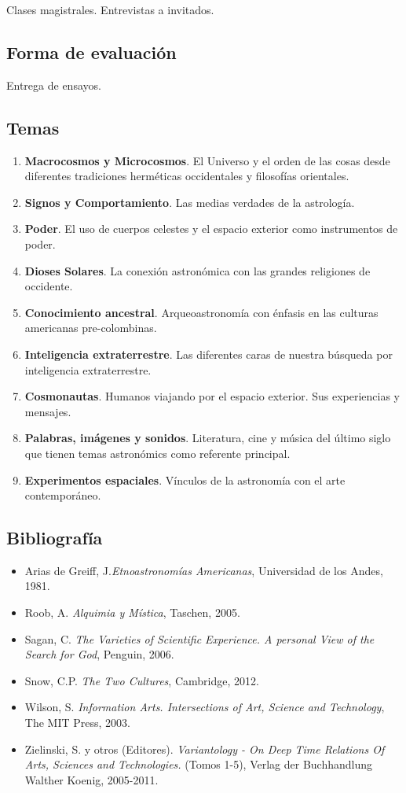 \documentclass{report}
\begin{document}
Clases magistrales. Entrevistas a invitados.

\subsection*{Forma de evaluaci\'on}

Entrega de ensayos.

\subsection*{Temas}

\begin{enumerate}
\item {\bf Macrocosmos y Microcosmos}. El Universo y el orden de las
  cosas desde diferentes tradiciones herm\'eticas occidentales y
  filosof\'ias orientales.
\item {\bf Signos y Comportamiento}. Las medias verdades de la astrolog\'ia.
\item {\bf Poder}. El uso de cuerpos celestes y el espacio exterior como instrumentos de poder. 
\item {\bf Dioses Solares}. La conexi\'on astron\'omica con las grandes religiones de occidente. 
\item {\bf Conocimiento ancestral}. Arqueoastronom\'ia con \'enfasis en las culturas americanas pre-colombinas.
\item {\bf Inteligencia extraterrestre}. Las diferentes caras de
  nuestra b\'usqueda por inteligencia extraterrestre.
\item {\bf Cosmonautas}. Humanos viajando por el espacio exterior. Sus experiencias y mensajes.
\item {\bf Palabras, im\'agenes y sonidos}. Literatura, cine y
  m\'usica del \'ultimo siglo que tienen temas astron\'omics como
  referente principal.
\item {\bf Experimentos espaciales}. V\'inculos de la astronom\'ia con
  el arte contempor\'aneo.
\end{enumerate}

\subsection*{Bibliografía}

\begin{itemize}
\item Arias de Greiff, J.\emph{Etnoastronom\'ias Americanas}, Universidad de los Andes, 1981.
\item Roob, A. \emph{Alquimia y M\'istica}, Taschen, 2005.
\item Sagan, C. \emph{The Varieties of Scientific Experience. A personal View of the Search for God}, Penguin, 2006.
\item Snow, C.P. \emph{The Two Cultures}, Cambridge, 2012.
\item Wilson, S. \emph{Information Arts. Intersections of Art, Science
and Technology}, The MIT Press, 2003.
\item Zielinski, S. y otros (Editores). \emph{Variantology - On Deep Time
  Relations Of Arts, Sciences and Technologies.} (Tomos 1-5), Verlag
der Buchhandlung Walther Koenig, 2005-2011.
\end{itemize}
\end{document}
